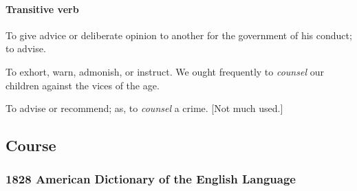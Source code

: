 			\paragraph{Transitive verb}
		
			\begin{compactitem}
				\item To give advice or deliberate opinion to another for the government of his conduct; to advise.
				\item To exhort, warn, admonish, or instruct. We ought frequently to \textit{counsel} our children against the vices of the age.
				\item To advise or recommend; as, to \textit{counsel} a crime. [Not much used.]
			\end{compactitem}
			
	\subsection{Course} %
		\label{COURSE}
		
		\subsubsection{1828 American Dictionary of the English Language}
		
